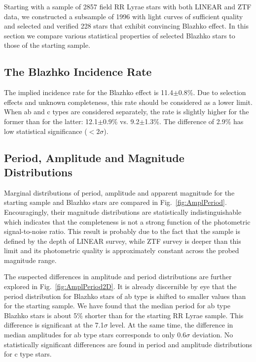 Starting with a sample of 2857 field RR Lyrae stars with both LINEAR and ZTF data, we constructed a subsample of
1996 with light curves of sufficient quality and selected and verified 228 stars that exhibit convincing Blazhko effect.
In this section we compare various statistical properties of selected Blazhko stars to those of the starting sample. 

\subsection{The Blazhko Incidence Rate}

The implied incidence rate for the Blazhko effect is
11.4$\pm$0.8\%. Due to selection effects and unknown completeness,
this rate should be considered as a lower limit. 
When ab and c types are considered separately, the
rate is slightly higher for the former than for the latter: 12.1$\pm$0.9\%
vs. 9.2$\pm$1.3\%.  The difference of 2.9\% has low statistical significance ($<2\sigma$). 


\subsection{Period, Amplitude and Magnitude Distributions}

 
Marginal distributions of  period, amplitude and apparent magnitude
for the starting sample and Blazhko stars are compared in Fig.~\ref{fig:AmplPeriod}. 
Encouragingly, their magnitude distributions are statistically
indistinguishable which indicates that the completeness is not a
strong function of the photometric signal-to-noise ratio. This
result is probably due to the fact that the sample is defined by the
depth of LINEAR survey, while ZTF survey is deeper than this limit and
its photometric quality is approximately constant across the probed
magnitude range. 

The suspected differences in amplitude and period distributions are
further explored in Fig.~\ref{fig:AmplPeriod2D}. It is already
discernible by eye that the period distribution for Blazhko stars of
ab type is shifted to smaller values than for the starting sample. We have
found that the median period for ab type Blazhko stars is about 5\% shorter
than for the starting RR Lyrae sample. This difference is significant at
the 7.1$\sigma$ level.  At the same time, the difference in median
amplitudes for ab type stars corresponds to only 0.6$\sigma$ deviation. 
No statistically significant differences are found in period and
amplitude distributions for c type stars. 



